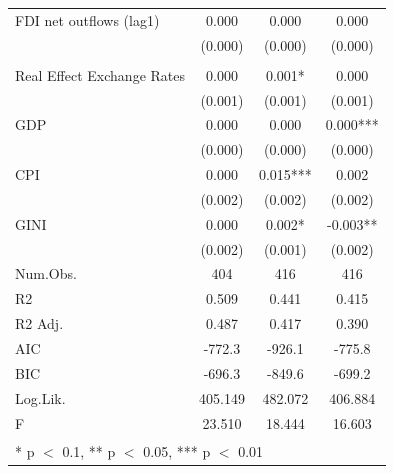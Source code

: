 \documentclass[
]{article}
\begin{document}
\begin{table}
\begin{tabular}[t]{lccc}
\hspace{1em}FDI net outflows (lag1) & 0.000 & 0.000 & 0.000\\
\hspace{1em} & (0.000) & (0.000) & \vphantom{1} (0.000)\\
\addlinespace[0.3em]
\multicolumn{4}{l}{\textbf{Control variable}}\\
\hspace{1em}Real Effect Exchange Rates & 0.000 & 0.001* & 0.000\\
\hspace{1em} & (0.001) & (0.001) & (0.001)\\
\hspace{1em}GDP & 0.000 & 0.000 & 0.000***\\
\hspace{1em} & (0.000) & (0.000) & (0.000)\\
\hspace{1em}CPI & 0.000 & 0.015*** & 0.002\\
\hspace{1em} & (0.002) & (0.002) & (0.002)\\
\hspace{1em}GINI & 0.000 & 0.002* & -0.003**\\
\hspace{1em} & (0.002) & (0.001) & (0.002)\\
\midrule
Num.Obs. & 404 & 416 & 416\\
R2 & 0.509 & 0.441 & 0.415\\
R2 Adj. & 0.487 & 0.417 & 0.390\\
AIC & -772.3 & -926.1 & -775.8\\
BIC & -696.3 & -849.6 & -699.2\\
Log.Lik. & 405.149 & 482.072 & 406.884\\
F & 23.510 & 18.444 & 16.603\\
\bottomrule
\multicolumn{4}{l}{\textsuperscript{} * p $<$ 0.1, ** p $<$ 0.05, *** p $<$ 0.01}\\
\end{tabular}
\end{table}
\end{document}
